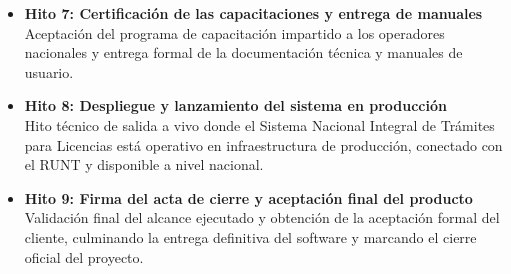 \begin{itemize}
\item \textbf{Hito 7: Certificación de las capacitaciones y entrega de manuales} \\
Aceptación del programa de capacitación impartido a los operadores nacionales y entrega formal de la documentación técnica y manuales de usuario.

\item \textbf{Hito 8: Despliegue y lanzamiento del sistema en producción} \\
Hito técnico de salida a vivo donde el Sistema Nacional Integral de Trámites para Licencias está operativo en infraestructura de producción, conectado con el RUNT y disponible a nivel nacional.

\item \textbf{Hito 9: Firma del acta de cierre y aceptación final del producto} \\
Validación final del alcance ejecutado y obtención de la aceptación formal del cliente, culminando la entrega definitiva del software y marcando el cierre oficial del proyecto.

\end{itemize}
